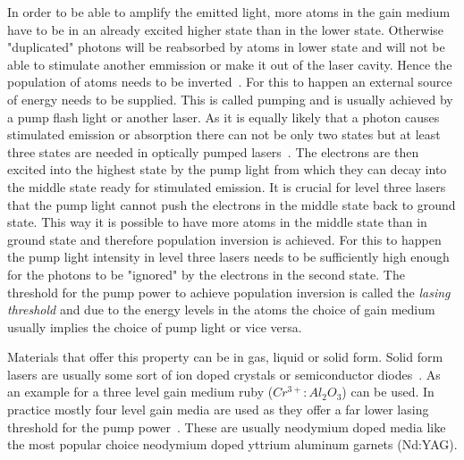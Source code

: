 \documentclass[a4paper,10pt]{article}
\begin{document}
    In order to be able to amplify the emitted light, more atoms in the
    gain medium have to be in an already excited higher state than
    in the lower state.
    Otherwise "duplicated" photons will be reabsorbed by atoms in lower
    state and will not be able to stimulate another emmission or make
    it out of the laser cavity.
    Hence the population of atoms needs to be inverted~\cite{lasers_liverpool}.
    For this to happen an external source of energy needs to be supplied.
    This is called pumping and is usually achieved by a pump flash light
    or another laser.
    As it is equally likely that a photon causes stimulated emission or
    absorption there can not be only two states but at least three
    states are needed in optically pumped lasers~\cite{lasers_rpphotonics}.
    The electrons are then excited into the highest state by the pump
    light from which they can decay into the middle state ready for
    stimulated emission.
    It is crucial for level three lasers that the pump light cannot
    push the electrons in the middle state back to ground state.
    This way it is possible to have more atoms in the middle state than
    in ground state and therefore population inversion is achieved.
    For this to happen the pump light intensity in level three lasers
    needs to be sufficiently high enough for the photons to be "ignored"
    by the electrons in the second state.
    The threshold for the pump power to achieve population inversion
    is called the \emph{lasing threshold} and due to the
    energy levels in the atoms the choice of gain medium usually
    implies the choice of pump light or vice versa.  

    Materials that offer this property can be in gas, liquid or solid form.
    Solid form lasers are usually some sort of ion doped crystals or
    semiconductor diodes~\cite{lasers_liverpool}.
    As an example for a three level gain medium ruby ($Cr^{3+}:Al_2O_3$)
    can be used.
    In practice mostly four level gain media are used as they offer a 
    far lower lasing threshold for the pump power~\cite{lasers_rpphotonics}.
    These are usually neodymium doped media like the most popular choice
    neodymium doped yttrium aluminum garnets (Nd:YAG).
\end{document}
